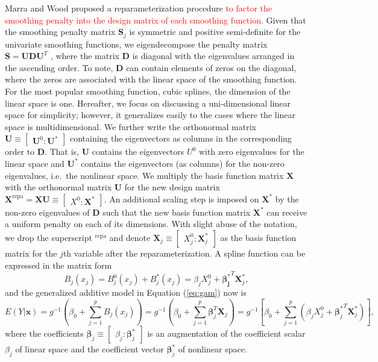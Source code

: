 \documentclass[AMA,STIX1COL,]{WileyNJD-v2}
\begin{document}
Marra and Wood \citep{Marra2011} proposed a reparameterization procedure
\textcolor{red}{to factor the smoothing penalty into the design matrix of each smoothing function}.
Given that the smoothing penalty matrix \(\boldsymbol{S}_j\) is
symmetric and positive semi-definite for the univariate smoothing
functions, we eigendecompose the penalty matrix
\(\boldsymbol{S} = \boldsymbol{U} \boldsymbol{D} \boldsymbol{U}^T\) ,
where the matrix \(\boldsymbol{D}\) is diagonal with the eigenvalues
arranged in the ascending order. To note, \(\boldsymbol{D}\) can contain
elements of zeros on the diagonal, where the zeros are associated with
the linear space of the smoothing function. For the most popular
smoothing function, cubic splines, the dimension of the linear space is
one. Hereafter, we focus on discussing a uni-dimensional linear space
for simplicity; however, it generalizes easily to the cases where the
linear space is multidimensional. We further write the orthonormal
matrix
\(\boldsymbol{U} \equiv \begin{bmatrix} \boldsymbol{U}^0 : \boldsymbol{U}^{*}\end{bmatrix}\)
containing the eigenvectors as columns in the corresponding order to
\(\boldsymbol{D}\). That is, \(\boldsymbol{U}\) contains the
eigenvectors \(U^0\) with zero eigenvalues for the linear space and
\(\boldsymbol{U}^{*}\) contains the eigenvectors (as columns) for the
non-zero eigenvalues, i.e.~the nonlinear space. We multiply the basis
function matrix \(\boldsymbol{X}\) with the orthonormal matrix
\(\boldsymbol{U}\) for the new design matrix
\({\boldsymbol{X}}^\text{repa}= \boldsymbol{X} \boldsymbol{U} \equiv \begin{bmatrix} X^0 : \boldsymbol{X}^{*} \end{bmatrix}\).
An additional scaling step is imposed on \(\boldsymbol{X}^{*}\) by the
non-zero eigenvalues of \(\boldsymbol{D}\) such that the new basis
function matrix \(\boldsymbol{X}^\ast\) can receive a uniform penalty on
each of its dimensions. With slight abuse of the notation, we drop the
superscript \(^\text{repa}\) and denote
\(\boldsymbol{X}_j \equiv \begin{bmatrix} X_j^0 : \boldsymbol{X}_j^{*} \end{bmatrix}\)
as the basis function matrix for the \(j\)th variable after the
reparameterization. A spline function can be expressed in the matrix
form \[
B_j(x_j) = B_j^0(x_j) + B_j^*(x_j) = \beta_j X^0_j + \boldsymbol{\beta_j^*}^T \boldsymbol{X}_j^*,
\] and the generalized additive model in Equation (\ref{eq:gam}) now is
\begin{equation}\label{eq:gam-repa}
E(Y|\boldsymbol{x}) = g^{-1}(\beta_0 + \sum\limits^p_{j=1} B_j(x_j)) = g^{-1}(\beta_0 + \sum\limits^p_{j=1} \boldsymbol{\beta}_j^T \boldsymbol{X}_j) = g^{-1}\left[\beta_0 + \sum\limits^p_{j=1} (\beta_j X^0_j + {\boldsymbol{\beta}_j^*}^T \boldsymbol{X}_j^*)\right],
\end{equation} where the coefficients
\(\boldsymbol{\beta}_j \equiv \begin{bmatrix} \beta_j : \boldsymbol{\beta}^*_j \end{bmatrix}\)
is an augmentation of the coefficient scalar \(\beta_j\) of linear space
and the coefficient vector \(\boldsymbol{\beta}^*_j\) of nonlinear
space.
\end{document}
